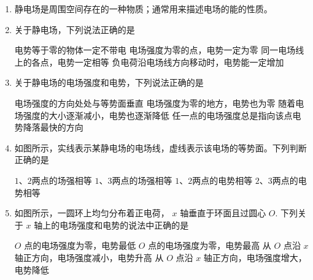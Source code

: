 
\begin{enumerate}[leftmargin=0em]
\renewcommand{\labelenumi}{\arabic{enumi}.}
\item
{}
静电场是周围空间存在的一种物质；通常用来描述电场的能的性质。


\item
{}
关于静电场，下列说法正确的是  


\fourchoices
{电势等于零的物体一定不带电}
{电场强度为零的点，电势一定为零}
{同一电场线上的各点，电势一定相等}
{负电荷沿电场线方向移动时，电势能一定增加}




\item
{}
关于静电场的电场强度和电势，下列说法正确的是  


\fourchoices
{电场强度的方向处处与等势面垂直 }
{电场强度为零的地方，电势也为零}
{随着电场强度的大小逐渐减小，电势也逐渐降低}
{任一点的电场强度总是指向该点电势降落最快的方向}






\item
{}
如图所示，实线表示某静电场的电场线，虚线表示该电场的等势面。下列判断正确的是  
\begin{figure}[h!]
\centering

\end{figure}

\fourchoices
{$ 1 $、$ 2 $两点的场强相等}
{$ 1 $、$ 3 $两点的场强相等}
{$ 1 $、$ 2 $两点的电势相等}
{$ 2 $、$ 3 $两点的电势相等}




\item
{}
如图所示，一圆环上均匀分布着正电荷， $ x $ 轴垂直于环面且过圆心 $ O $. 下列关于 $ x $ 轴上的电场强度和电势的说法中正确的是  
\begin{figure}[h!]
\centering

\end{figure}


\fourchoices
{$ O $ 点的电场强度为零，电势最低}
{$ O $ 点的电场强度为零，电势最高}
{从 $ O $ 点沿 $ x $ 轴正方向，电场强度减小，电势升高}
{从 $ O $ 点沿 $ x $ 轴正方向，电场强度增大，电势降低}






\end{enumerate}
